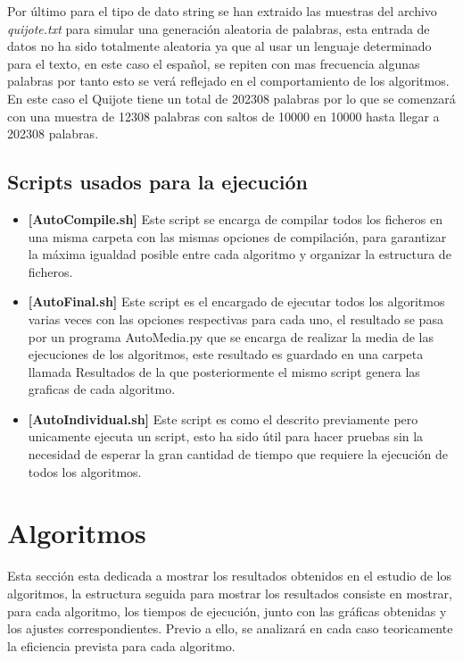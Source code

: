 \documentclass[11pt]{article}
\begin{document}
    Por último para el tipo de dato string se han extraido las muestras del archivo \textit{quijote.txt} para simular una generación aleatoria de palabras, 
    esta entrada de datos no ha sido totalmente aleatoria ya que al usar un lenguaje determinado para el texto, en este caso el español, se repiten con mas frecuencia algunas palabras por tanto esto se verá 
    reflejado en el comportamiento de los  algoritmos. En este caso el Quijote tiene un total de 202308 palabras por lo que se comenzará con una muestra de 12308 palabras con saltos de 
    10000 en 10000 hasta llegar a 202308 palabras.
    \subsection{Scripts usados para la ejecución}
    \begin{itemize}
        \item \textbf{[AutoCompile.sh]} Este script se encarga de compilar todos los ficheros en una misma carpeta con las mismas
        opciones de compilación, para garantizar la máxima igualdad posible entre cada algoritmo y organizar la estructura de 
        ficheros.
        \item \textbf{[AutoFinal.sh]} Este script es el encargado de ejecutar todos los algoritmos varias veces con las opciones respectivas para cada uno,
        el resultado se pasa por un programa AutoMedia.py que se encarga de realizar la media de las ejecuciones de los algoritmos,
        este resultado es guardado en una carpeta llamada Resultados de la que posteriormente el mismo script genera las graficas
        de cada algoritmo.
        \item \textbf{[AutoIndividual.sh]} Este script es como el descrito previamente pero unicamente ejecuta un script, esto ha sido útil para hacer
        pruebas sin la necesidad de esperar la gran cantidad de tiempo que requiere la ejecución de todos los algoritmos.
    \end{itemize}
    
\section{Algoritmos}
    Esta sección esta dedicada a mostrar los resultados obtenidos en el estudio de los algoritmos,
    la estructura seguida para mostrar los resultados consiste en mostrar, para cada algoritmo, los tiempos 
    de ejecución, junto con las gráficas obtenidas y los ajustes correspondientes. Previo a ello, se analizará
    en cada caso teoricamente la eficiencia prevista para cada algoritmo.
\end{document}
